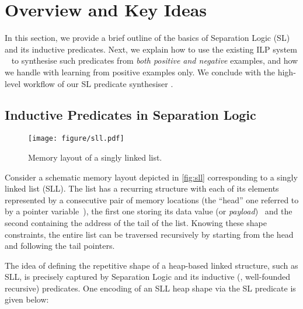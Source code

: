 

\section{Overview and Key Ideas}
\label{sec:overview}


In this section, we provide a brief outline of the basics of
Separation Logic (SL) and its inductive predicates. Next, we explain
how to use the existing ILP system \popper~\cite{cropper2021learning}
to synthesise such predicates from \emph{both positive and negative}
examples, and how we handle with learning from positive examples only.
%
We conclude with the high-level workflow of our SL predicate
synthesiser \tool.

\subsection{Inductive Predicates in Separation Logic}
\label{sec:sl}

\begin{figure}
  \centering
  \texttt{[image: figure/sll.pdf]}

  \caption{Memory layout of a singly linked list.}
  \label{fig:sll}
\end{figure}
% 
Consider a schematic memory layout depicted in \autoref{fig:sll}
corresponding to a singly linked list (SLL).
%
The list has a recurring structure with each of its elements
represented by a consecutive pair of memory locations (the ``head''
one referred to by a pointer variable~), the first one storing
its data value (or \emph{payload})~ and the second containing
the address  of the tail of the list. 
%
Knowing these shape constraints, the entire list can be traversed
recursively by starting from the head and following the tail pointers.


The idea of defining the repetitive shape of a heap-based linked
structure, such as SLL, is precisely captured by Separation Logic and
its inductive (\ie, well-founded recursive) predicates. One encoding
of an SLL heap shape via the SL predicate  is given below:


